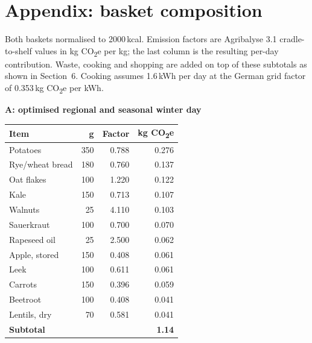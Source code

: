 \documentclass[11pt,a4paper]{article}
\newcommand{\co}{CO\textsubscript{2}e}
\begin{document}
\section*{Appendix: basket composition}

Both baskets normalised to 2000\,kcal. Emission factors are Agribalyse 3.1
cradle-to-shelf values in kg \co{} per kg; the last column is the resulting per-day
contribution. Waste, cooking and shopping are added on top of these subtotals as shown
in Section~6. Cooking assumes 1.6\,kWh per day at the German grid factor of 0.353\,kg
\co{} per kWh.

\vspace{0.4em}
\noindent
\begin{minipage}[t]{0.485\textwidth}
\footnotesize
\textbf{A: optimised regional and seasonal winter day}\\[0.3em]
\begin{tabular}{@{}lrrr@{}}
\toprule
Item & g & Factor & kg \co{} \\
\midrule
Potatoes & 350 & 0.788 & 0.276 \\
Rye/wheat bread & 180 & 0.760 & 0.137 \\
Oat flakes & 100 & 1.220 & 0.122 \\
Kale & 150 & 0.713 & 0.107 \\
Walnuts & 25 & 4.110 & 0.103 \\
Sauerkraut & 100 & 0.700 & 0.070 \\
Rapeseed oil & 25 & 2.500 & 0.062 \\
Apple, stored & 150 & 0.408 & 0.061 \\
Leek & 100 & 0.611 & 0.061 \\
Carrots & 150 & 0.396 & 0.059 \\
Beetroot & 100 & 0.408 & 0.041 \\
Lentils, dry & 70 & 0.581 & 0.041 \\
\midrule
\textbf{Subtotal} & & & \textbf{1.14} \\
\bottomrule
\end{tabular}
\end{minipage}
\hfill
\end{document}
